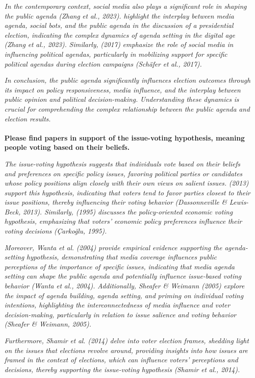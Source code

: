 \documentclass[11pt,a4paper]{article}
\begin{document}
 \textit{In the contemporary context, social media also plays a significant role in shaping the public agenda (Zhang et al., 2023). highlight the interplay between media agenda, social bots, and the public agenda in the discussion of a presidential election, indicating the complex dynamics of agenda setting in the digital age (Zhang et al., 2023). Similarly, (2017) emphasize the role of social media in influencing political agendas, particularly in mobilizing support for specific political agendas during election campaigns (Schäfer et al., 2017).}

 \textit{In conclusion, the public agenda significantly influences election outcomes through its impact on policy responsiveness, media influence, and the interplay between public opinion and political decision-making. Understanding these dynamics is crucial for comprehending the complex relationship between the public agenda and election results.}
\\
\\
 \textbf{Please find papers in support of the issue-voting hypothesis, meaning people voting based on their beliefs.}

\textit{The issue-voting hypothesis suggests that individuals vote based on their beliefs and preferences on specific policy issues, favoring political parties or candidates whose policy positions align closely with their own views on salient issues. (2013) support this hypothesis, indicating that voters tend to favor parties closest to their issue positions, thereby influencing their voting behavior (Dassonneville \& Lewis-Beck, 2013). Similarly, (1995) discusses the policy-oriented economic voting hypothesis, emphasizing that voters' economic policy preferences influence their voting decisions (Çarkoğlu, 1995).}

 \textit{Moreover, Wanta et al. (2004) provide empirical evidence supporting the agenda-setting hypothesis, demonstrating that media coverage influences public perceptions of the importance of specific issues, indicating that media agenda setting can shape the public agenda and potentially influence issue-based voting behavior (Wanta et al., 2004). Additionally, Sheafer \& Weimann (2005) explore the impact of agenda building, agenda setting, and priming on individual voting intentions, highlighting the interconnectedness of media influence and voter decision-making, particularly in relation to issue salience and voting behavior (Sheafer \& Weimann, 2005).}

 \textit{Furthermore, Shamir et al. (2014) delve into voter election frames, shedding light on the issues that elections revolve around, providing insights into how issues are framed in the context of elections, which can influence voters' perceptions and decisions, thereby supporting the issue-voting hypothesis (Shamir et al., 2014).}
\end{document}
